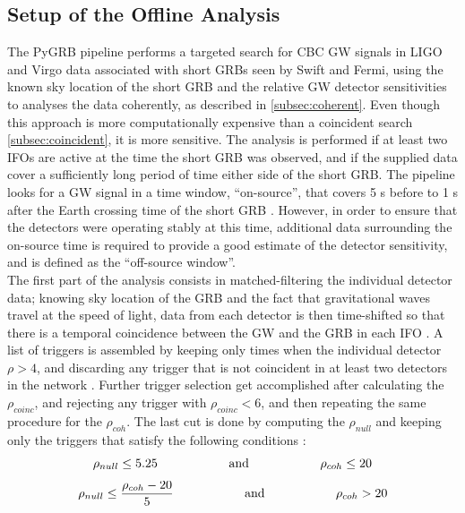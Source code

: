 \documentclass[binding=0.6cm, LaM]{sapthesis}
\begin{document}
\subsection{Setup of the Offline Analysis}
\label{subsec:pygrb}
	The {\ttfamily PyGRB} pipeline performs a targeted search for CBC GW signals in LIGO and Virgo data associated with short GRBs seen by Swift and Fermi,
        using the known sky location of the short GRB and the relative GW detector sensitivities to analyses the data coherently, as described in \ref{subsec:coherent}.
        Even though this approach is more computationally expensive than a coincident search \ref{subsec:coincident},
        it is more sensitive.
	The analysis is performed if at least two IFOs are active at the time the short GRB was observed, 
	and if the supplied data cover a sufficiently long period of time either side of the short GRB.
	The pipeline looks for a GW signal in a time window, “on-source”, that covers  5 s before to 1 s 
	after the Earth crossing time of the short GRB \cite{92, 136}.
	However, in order to ensure that the detectors were operating stably at this time,
        additional data surrounding the on-source time is required to provide a good estimate of the detector sensitivity,
	and is defined as the “off-source window”. \\
	The first part of the analysis consists in matched-filtering the individual detector data;
	knowing sky location of the GRB and the fact that gravitational waves travel at the speed of light,
	data from each detector is then time-shifted so that there is a temporal coincidence between the GW and the GRB in each IFO \cite{92}.
	A list of triggers is assembled by keeping only times when the individual detector $\rho > 4$,
	and discarding any trigger that is not coincident in at least two detectors in the network \cite{92}. 
	Further trigger selection get accomplished after calculating the $\rho_{coinc}$, 
	and rejecting any trigger with $\rho_{coinc}<6$, and then repeating the same procedure for the $\rho_{coh}$.
	The last cut is done by computing the $\rho_{null}$ and keeping only the triggers that satisfy the following conditions \cite{46}:
		\begin{equation}
			\rho_{null} \leq 5.25 \hspace*{2cm} \text{and} \hspace*{2cm} \rho_{coh} \leq 20
		\end{equation}
		\begin{equation}
			\rho_{null} \leq {{\rho_{coh}-20}\over {5}} \hspace*{2cm} \text{and} \hspace*{2cm} \rho_{coh} > 20
		\end{equation}
\end{document}
